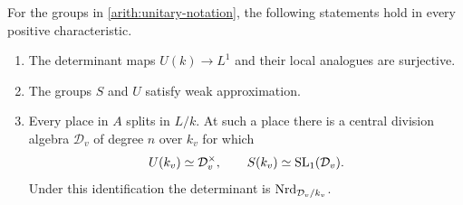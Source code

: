 \begin{proposition}\label{arith:unitary-reduction}
For the groups in \eqref{arith:unitary-notation}, the following statements
hold in every positive characteristic.
\begin{enumerate}
\item The determinant maps $U(k)\to L^1$ and their local analogues are
surjective.
\item The groups $S$ and $U$ satisfy weak approximation.
\item Every place in $A$ splits in $L/k$.  At such a place there is a
central division algebra $\mathcal D_v$ of degree $n$ over $k_v$ for which
\[
 U(k_v)\simeq\mathcal D_v^\times,
 \qquad S(k_v)\simeq\operatorname{SL}_1(\mathcal D_v).
\]
Under this identification the determinant is $\operatorname{Nrd}_{\mathcal D_v/k_v}$.
\end{enumerate}
\end{proposition}

